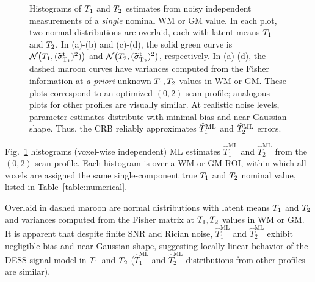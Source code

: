 \begin{figure} [!tbp]
	\centering
	\hspace{1cm}
	\vspace{0.2cm}
	
	\hspace{1cm}
	\caption{
		Histograms of $T_1$ and $T_2$ estimates 
		from noisy independent measurements 
		of a \emph{single} nominal WM or GM value. 
		In each plot, two normal distributions are overlaid, 
		each with latent means $T_1$ and $T_2$. 
		In (a)-(b) and (c)-(d), the solid green curve 
		is $\gauss{\To}{(\sigwot)^2)}$ 
		and $\gauss{\Tt}{(\sigwtt)^2}$, respectively.
		In (a)-(d), the dashed maroon curves have variances computed 
		from the Fisher information at \emph{a priori} unknown $T_1, T_2$ values 
		in WM or GM. 
		These plots correspond to an optimized $(0,2)$ scan profile; 
		analogous plots for other profiles are visually similar. 
		At realistic noise levels,
		parameter estimates distribute 
		with minimal bias and near-Gaussian shape.
		Thus, the CRB reliably approximates 
		$\widehat{T}_1^\mathrm{ML}$ and $\widehat{T}_2^\mathrm{ML}$ errors.
	}
	\label{fig:normality}
\end{figure}

Fig.~\ref{fig:normality} histograms (voxel-wise independent) ML estimates 
$\widehat{T}_1^{\mathrm{ML}}$ and $\widehat{T}_2^{\mathrm{ML}}$ 
from the $(0,2)$ scan profile.
Each histogram is over a WM or GM ROI, 
within which all voxels are assigned 
the same single-component true $T_1$ and $T_2$ nominal value, 
listed in Table~\ref{table:numerical}.

Overlaid in dashed maroon are normal distributions 
with latent means $T_1$ and $T_2$ 
and variances computed 
from the Fisher matrix at $T_1,T_2$ values 
in WM or GM. 
It is apparent that despite finite SNR and Rician noise, 
$\widehat{T}_1^{\mathrm{ML}}$ and $\widehat{T}_2^{\mathrm{ML}}$ 
exhibit negligible bias and near-Gaussian shape, 
suggesting locally linear behavior of the DESS signal model 
in $T_1$ and $T_2$ 
($\widehat{T}_1^{\mathrm{ML}}$ and $\widehat{T}_2^{\mathrm{ML}}$ distributions 
from other profiles are similar). 

